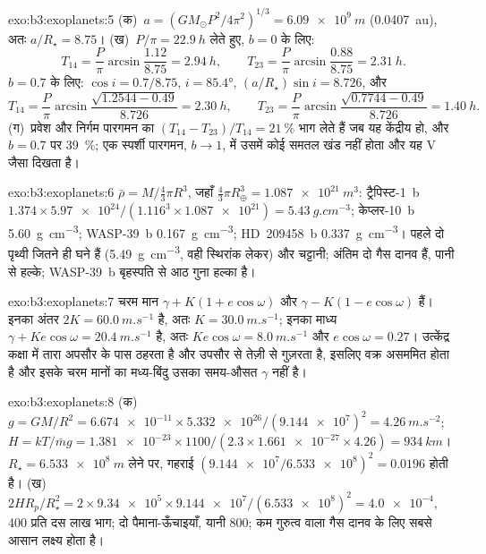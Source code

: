 \begin{solution}{exo:b3:exoplanets:5}
(क)~$a = (GM_\odot P^2/4\pi^2)^{1/3} = \qty{6.09e9}{m}$ (\qty{0.0407}{au}),
अतः $a/R_\star = 8.75$। (ख)~$P/\pi = \qty{22.9}{h}$ लेते हुए, $b = 0$ के लिए:
\[
T_{14} = \frac P\pi\arcsin\frac{1.12}{8.75} = \qty{2.94}{h}, \qquad
T_{23} = \frac P\pi\arcsin\frac{0.88}{8.75} = \qty{2.31}{h}.
\]
$b = 0.7$ के लिए: $\cos i = 0.7/8.75$, $i = \ang{85.4}$, $(a/R_\star)\sin i =
8.726$, और
\[
T_{14} = \frac P\pi\arcsin\frac{\sqrt{1.2544 - 0.49}}{8.726} = \qty{2.30}{h},
\qquad
T_{23} = \frac P\pi\arcsin\frac{\sqrt{0.7744 - 0.49}}{8.726} = \qty{1.40}{h}.
\]
(ग)~प्रवेश और निर्गम पारगमन का $(T_{14} - T_{23})/T_{14} = \qty{21}{\percent}$
भाग लेते हैं जब यह केंद्रीय हो, और $b = 0.7$ पर \qty{39}{\percent}; एक
स्पर्शी पारगमन, $b \to 1$, में उसमें कोई समतल खंड नहीं होता और यह V जैसा दिखता है।
\end{solution}

\begin{solution}{exo:b3:exoplanets:6}
$\bar\rho = M/\tfrac43\pi R^3$, जहाँ $\tfrac43\pi R_\oplus^3 =
\qty{1.087e21}{m^3}$: ट्रैपिस्ट-1~b $1.374\times\num{5.97e24}/(1.116^3\times
\num{1.087e21}) = \qty{5.43}{g.cm^{-3}}$; केप्लर-10~b
\qty{5.60}{g.cm^{-3}}; WASP-39~b \qty{0.167}{g.cm^{-3}}; HD~209458~b
\qty{0.337}{g.cm^{-3}}। पहले दो पृथ्वी जितने ही घने हैं
(\qty{5.49}{g.cm^{-3}}, वही स्थिरांक लेकर) और चट्टानी; अंतिम दो
गैस दानव हैं, पानी से हल्के; WASP-39~b
बृहस्पति से आठ गुना हल्का है।
\end{solution}

\begin{solution}{exo:b3:exoplanets:7}
चरम मान $\gamma + K(1 + e\cos\omega)$ और $\gamma - K(1 -
e\cos\omega)$ हैं। इनका अंतर $2K = \qty{60.0}{m.s^{-1}}$ है, अतः $K =
\qty{30.0}{m.s^{-1}}$; इनका माध्य $\gamma + Ke\cos\omega =
\qty{20.4}{m.s^{-1}}$ है, अतः $Ke\cos\omega = \qty{8.0}{m.s^{-1}}$ और
$e\cos\omega = 0.27$। उत्केंद्र कक्षा में तारा अपसौर के पास ठहरता है
और उपसौर से तेज़ी से गुज़रता है, इसलिए वक्र असममित होता है और
इसके चरम मानों का मध्य-बिंदु उसका समय-औसत $\gamma$ नहीं है।
\end{solution}

\begin{solution}{exo:b3:exoplanets:8}
(क)~$g = GM/R^2 = \num{6.674e-11}\times\num{5.332e26}/(\num{9.144e7})^2 =
\qty{4.26}{m.s^{-2}}$; $H = kT/\bar m g = \num{1.381e-23}\times1100/(2.3
\times\num{1.661e-27}\times4.26) = \qty{934}{km}$। $R_\star =
\qty{6.533e8}{m}$ लेने पर, गहराई $(\num{9.144e7}/\num{6.533e8})^2 =
\num{0.0196}$ होती है। (ख)~$2HR_p/R_\star^2 = 2\times\num{9.34e5}\times
\num{9.144e7}/(\num{6.533e8})^2 = \num{4.0e-4}$, 400 प्रति दस लाख भाग;
दो पैमाना-ऊँचाइयाँ, यानी 800; कम गुरुत्व वाला गैस दानव
 के लिए सबसे आसान लक्ष्य होता है।
\end{solution}

